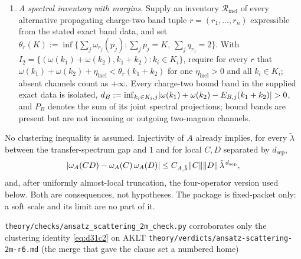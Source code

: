 \begin{definition}
\begin{enumerate}
  Filters satisfy $\chi_i=1$ on $K_i$ and $\supp\chi_i\subset U_i$; companion
  filters satisfy $\tilde\chi_i=1$ on $\supp\chi_i$ and
  $\supp\tilde\chi_i\subset U_i$; and $h_i=\omega\tilde\chi_i\in C^\infty(\mathbb{T})$.
\item \emph{A spectral inventory with margins.} Supply an inventory
  $\mathcal{R}_{\mathrm{inel}}$ of every alternative propagating charge-two
  band tuple $r=(r_1,\dots,r_n)$ expressible from the stated exact band data,
  and set $\theta_r(K):=\inf\{\sum_j\omega_{r_j}(p_j):\sum_jp_j=K,\ \sum_jq_{r_j}=2\}$.
  With $I_2=\{(\omega(k_1)+\omega(k_2),k_1+k_2):k_i\in K_i\}$, require for
  every $r$ that $\omega(k_1)+\omega(k_2)+\eta_{\mathrm{inel}}<\theta_r(k_1+k_2)$
  for one $\eta_{\mathrm{inel}}>0$ and all $k_i\in K_i$; absent channels count
  as $+\infty$. Every charge-two bound band in the supplied exact data is
  isolated, $d_B:=\inf_{k_i\in K_i,j}\lvert \omega(k_1)+\omega(k_2)-E_{B,j}(k_1+k_2)\rvert>0$,
  and $P_B$ denotes the sum of its joint spectral projections; bound bands are
  present but are not incoming or outgoing two-magnon channels.
\end{enumerate}
No clustering inequality is assumed. Injectivity of $A$ already implies, for
every $\tilde\lambda$ between the transfer-spectrum gap and $1$ and for local
$C,D$ separated by $d_{\mathrm{sep}}$,
\begin{equation}
  \lvert \omega_A(CD)-\omega_A(C)\,\omega_A(D)\rvert
  \le C_{A,\tilde\lambda}\lVert C\rVert\lVert D\rVert\,\tilde\lambda^{\,d_{\mathrm{sep}}},
  \label{eq:d31c2}
\end{equation}
and, after uniformly almost-local truncation, the four-operator version used
below. Both are consequences, not hypotheses. The package is fixed-packet
only: a soft scale and its limit are no part of it.
\end{definition}
%
{\texttt{theory/checks/ansatz\_scattering\_2m\_check.py} corroborates only the
clustering identity \cref{eq:d31c2} on AKLT}%
{\texttt{theory/verdicts/ansatz-scattering-2m-r6.md} (the merge that gave the
clause set a numbered home)}

